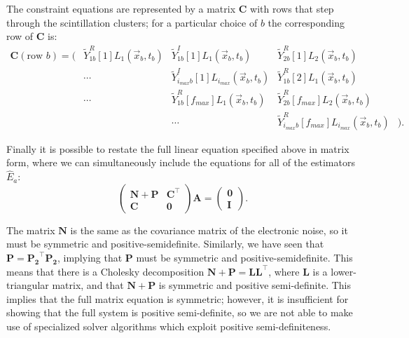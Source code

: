 The constraint equations are represented by a matrix $\mathbf{C}$ with rows that step through the scintillation clusters; for a particular choice of $b$ the corresponding row of $\mathbf{C}$  is:
\begin{equation} \begin{matrix}
\mathbf{C}(\text{row $b$}) = \bigg( & \widetilde{Y}^R_{1 b}[1] L_1(\vec{x}_b, t_b) & \widetilde{Y}^I_{1 b}[1] L_1(\vec{x}_b, t_b) & \widetilde{Y}^R_{2 b}[1] L_2(\vec{x}_b, t_b) \\
&\cdots & \widetilde{Y}^I_{i_{max} b}[1] L_{i_{max}}(\vec{x}_b, t_b) & \widetilde{Y}^R_{1 b}[2] L_1(\vec{x}_b, t_b) \\
&\cdots & \widetilde{Y}^R_{1 b}[f_{max}] L_1(\vec{x}_b, t_b) & \widetilde{Y}^R_{2 b}[f_{max}] L_2(\vec{x}_b, t_b) \\
& & \cdots & \widetilde{Y}^R_{i_{max} b}[f_{max}] L_{i_{max}}(\vec{x}_b, t_b) & \bigg).
\end{matrix}\end{equation}

Finally it is possible to restate the full linear equation specified above in matrix form, where we can simultaneously include the equations for all of the estimators $\widehat{E}_a$:
\begin{equation}\label{eqn:FullMatrixFormulation}
\begin{pmatrix}
\mathbf{N} + \mathbf{P} & \mathbf{C}^{\top} \\
\mathbf{C} & \mathbf{0}
\end{pmatrix} \mathbf{A} =
\begin{pmatrix}
\mathbf{0} \\
\mathbf{I}
\end{pmatrix}.
\end{equation}

The matrix $\mathbf{N}$ is the same as the covariance matrix of the electronic noise, so it must be symmetric and positive-semidefinite.  Similarly, we have seen that $\mathbf{P} = \mathbf{P_2}^{\top} \mathbf{P_2}$, implying that $\mathbf{P}$ must be symmetric and positive-semidefinite.  This means that there is a Cholesky decomposition $\mathbf{N} + \mathbf{P} = \mathbf{L}\mathbf{L}^{\top}$, where $\mathbf{L}$ is a lower-triangular matrix, and that $\mathbf{N} + \mathbf{P}$ is symmetric and positive semi-definite.  This implies that the full matrix equation is symmetric; however, it is insufficient for showing that the full system is positive semi-definite, so we are not able to make use of specialized solver algorithms which exploit positive semi-definiteness.

